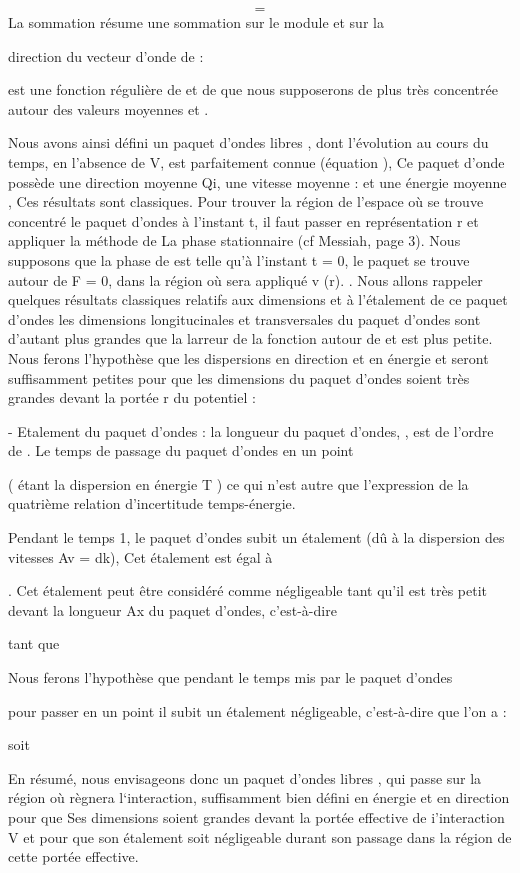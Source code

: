 \[
\tag{40}=
\]
La sommation résume une sommation sur le module  et sur la

direction  du vecteur d'onde de :

 est une fonction régulière de  et de  que nous supposerons
de plus très concentrée autour des valeurs moyennes  et .


Nous avons ainsi défini un paquet d'ondes libres ,
dont l'évolution au cours du temps, en l'absence de V, est parfaitement
connue (équation ),
Ce paquet d'onde possède une direction moyenne Qi, une vitesse moyenne :  et une
énergie moyenne , Ces résultats sont classiques. Pour trouver la région de l'espace
où se trouve concentré le paquet d'ondes à l'instant t, il faut passer en
représentation r et appliquer
la méthode de La phase stationnaire (cf Messiah, page 3).
Nous supposons que la phase de est telle qu'à
l'instant t = 0, le paquet se trouve autour de F = 0, dans la
région où sera appliqué v (r).
. Nous allons rappeler quelques résultats classiques relatifs
aux dimensions et à l'étalement de ce paquet d'ondes 
 les dimensions longitucinales et transversales du paquet d'ondes sont
d'autant plus grandes que la larreur de la fonction  autour de
 et  est plus petite. Nous ferons l'hypothèse que les dispersions en
direction et en énergie  et  seront suffisamment petites pour que les
dimensions du paquet d'ondes soient très grandes devant la portée r du
potentiel :

- Etalement du paquet d'ondes : la longueur du paquet d'ondes, , est
de l'ordre de . Le temps de passage du paquet d'ondes en un point

 ( étant la dispersion en énergie T )
ce qui n'est autre que l'expression de la quatrième relation d'incertitude
temps-énergie.

Pendant le temps 1, le paquet d'ondes subit un étalement (dû à
la dispersion des vitesses Av = dk), Cet étalement est égal à

. Cet étalement peut être considéré comme négligeable tant
qu'il est très petit devant la longueur Ax du paquet d'ondes, c'est-à-dire

tant que 

Nous ferons l'hypothèse que pendant le temps mis par le paquet d'ondes

pour passer en un point  il subit un étalement négligeable,
c'est-à-dire que l'on a :

 soit 

En résumé, nous envisageons donc un paquet d'ondes libres  , qui
passe sur la région où règnera l‘interaction, suffisamment bien défini en
énergie et en direction pour que Ses dimensions soient grandes devant la
portée effective de i'interaction V et pour que son étalement soit négligeable
durant son passage dans la région de cette portée effective.

